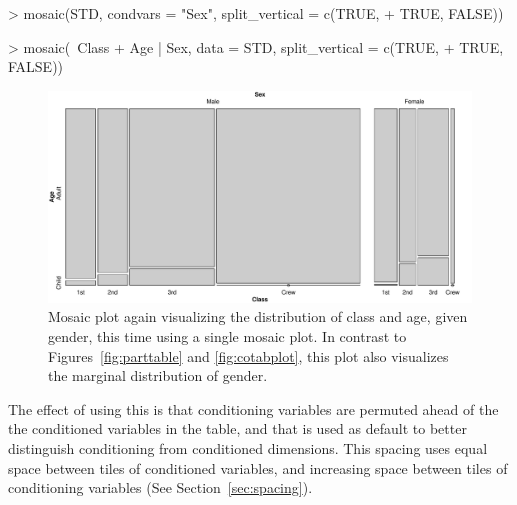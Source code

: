 \documentclass{Z}
\newcommand{\codefun}[1]{\code{#1()}}
\begin{document}
\begin{Schunk}
\begin{Sinput}
> mosaic(STD, condvars = "Sex", split_vertical = c(TRUE, 
+     TRUE, FALSE))
\end{Sinput}
\end{Schunk}
\begin{Schunk}
\begin{Sinput}
> mosaic(~Class + Age | Sex, data = STD, split_vertical = c(TRUE, 
+     TRUE, FALSE))
\end{Sinput}
\end{Schunk}

\begin{figure}[h]
\begin{center}
\includegraphics{strucplot-Conditioningfig}
\caption{Mosaic plot again visualizing the 
distribution of class and age, given gender, this time using a
single mosaic plot. In contrast to Figures~\ref{fig:parttable} and \ref{fig:cotabplot}, 
this plot also visualizes the marginal distribution of gender.}
\label{fig:conditioning}
\end{center}
\end{figure}

\noindent The effect of using this is that
conditioning variables are permuted ahead of the the conditioned variables
in the table, and that \codefun{spacing\_conditional} is used as default to better
distinguish conditioning from conditioned dimensions.
This spacing uses equal space between tiles of conditioned variables,
and increasing space between tiles of conditioning variables (See 
Section~\ref{sec:spacing}).
\end{document}
